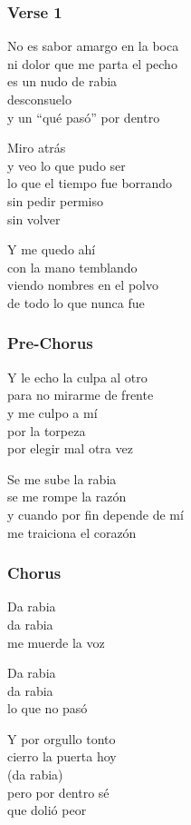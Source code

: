 \documentclass[]{article}
\begin{document}
\subsubsection{Verse 1}\label{verse-1-16}

No es sabor amargo en la boca\\
ni dolor que me parta el pecho\\
es un nudo de rabia\\
desconsuelo\\
y un ``qué pasó'' por dentro

Miro atrás\\
y veo lo que pudo ser\\
lo que el tiempo fue borrando\\
sin pedir permiso\\
sin volver

Y me quedo ahí\\
con la mano temblando\\
viendo nombres en el polvo\\
de todo lo que nunca fue

\subsubsection{Pre-Chorus}\label{pre-chorus-26}

Y le echo la culpa al otro\\
para no mirarme de frente\\
y me culpo a mí\\
por la torpeza\\
por elegir mal otra vez

Se me sube la rabia\\
se me rompe la razón\\
y cuando por fin depende de mí\\
me traiciona el corazón

\subsubsection{Chorus}\label{chorus-42}

Da rabia\\
da rabia\\
me muerde la voz

Da rabia\\
da rabia\\
lo que no pasó

Y por orgullo tonto\\
cierro la puerta hoy\\
(da rabia)\\
pero por dentro sé\\
que dolió peor
\end{document}

